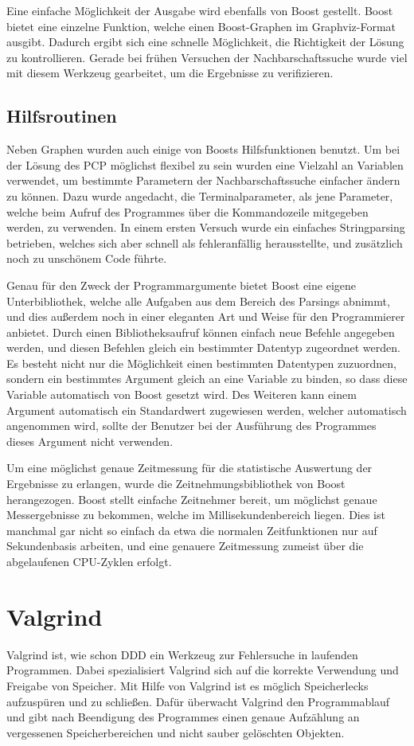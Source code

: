 Eine einfache Möglichkeit der Ausgabe wird ebenfalls von Boost gestellt. Boost bietet eine einzelne Funktion, welche einen Boost-Graphen im Graphviz-Format ausgibt. Dadurch ergibt sich eine schnelle 
Möglichkeit, die Richtigkeit der Lösung zu kontrollieren. Gerade bei frühen Versuchen der Nachbarschaftssuche wurde viel mit diesem Werkzeug gearbeitet, um die Ergebnisse zu verifizieren. 

\subsection{Hilfsroutinen}
Neben Graphen wurden auch einige von Boosts Hilfsfunktionen benutzt. Um bei der Lösung des PCP möglichst flexibel zu sein wurden eine Vielzahl an Variablen verwendet, um bestimmte Parametern der 
Nachbarschaftssuche einfacher ändern zu können. Dazu wurde angedacht, die Terminalparameter, als jene Parameter, welche beim Aufruf des Programmes über die Kommandozeile mitgegeben werden, zu verwenden. 
In einem ersten Versuch wurde ein einfaches Stringparsing betrieben, welches sich aber schnell als fehleranfällig herausstellte, und zusätzlich noch zu unschönem Code führte. 

Genau für den Zweck der Programmargumente bietet Boost eine eigene Unterbibliothek, welche alle Aufgaben aus dem Bereich des Parsings abnimmt, und dies außerdem noch in einer eleganten Art und Weise für
den Programmierer anbietet. Durch einen Bibliotheksaufruf können einfach neue Befehle angegeben werden, und diesen Befehlen gleich ein bestimmter Datentyp zugeordnet werden. Es besteht nicht nur die 
Möglichkeit einen bestimmten Datentypen zuzuordnen, sondern ein bestimmtes Argument gleich an eine Variable zu binden, so dass diese Variable automatisch von Boost gesetzt wird. Des Weiteren kann einem
Argument automatisch ein Standardwert zugewiesen werden, welcher automatisch angenommen wird, sollte der Benutzer bei der Ausführung des Programmes dieses Argument nicht verwenden. 

Um eine möglichst genaue Zeitmessung für die statistische Auswertung der Ergebnisse zu erlangen, wurde die Zeitnehmungsbibliothek von Boost herangezogen. Boost stellt einfache Zeitnehmer bereit, um 
möglichst genaue Messergebnisse zu bekommen, welche im Millisekundenbereich liegen. Dies ist manchmal gar nicht so einfach da etwa die normalen Zeitfunktionen nur auf Sekundenbasis arbeiten, und eine 
genauere Zeitmessung zumeist über die abgelaufenen CPU-Zyklen erfolgt.

\section{Valgrind}
Valgrind ist, wie schon DDD ein Werkzeug zur Fehlersuche in laufenden Programmen. Dabei spezialisiert Valgrind sich auf die korrekte Verwendung und Freigabe von Speicher. Mit Hilfe von Valgrind ist es
möglich Speicherlecks aufzuspüren und zu schließen. Dafür überwacht Valgrind den Programmablauf und gibt nach Beendigung des Programmes einen genaue Aufzählung an vergessenen Speicherbereichen und 
nicht sauber gelöschten Objekten. 

